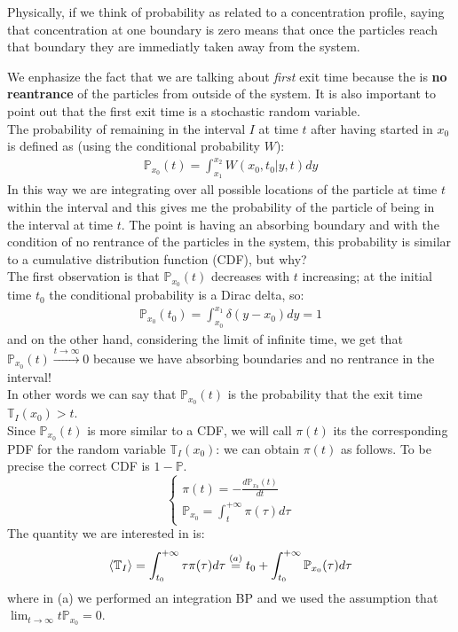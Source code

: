 \documentclass[\main/main.tex]{subfiles}
\begin{document}
Physically, if we think of probability as related to a concentration profile, saying that concentration at one boundary is zero means that once the particles reach that boundary they are immediatly taken away from the system.

We enphasize the fact that we are talking about \textit{first} exit time because the is \textbf{no reantrance} of the particles from outside of the system. It is also important to point out that the first exit time is a stochastic random variable. \\

The probability of remaining in the interval $I$ at time $t$ after having started in $x_0$ is defined as (using the conditional probability $W$):
\begin{eqnarray}
\mathbb{P}_{x_0}(t)=\int_{x_1} ^{x_2} W(x_0,t_0|y,t) dy
\label{eq:p_def}
\end{eqnarray}
In this way we are integrating over all possible locations of the particle at time $t$ within the interval and this gives me the probability of the particle of being in the interval at time $t$.
The point is having an absorbing boundary and with the condition of no rentrance of the particles in the system, this probability is similar to a cumulative distribution function (CDF), but why? \\
The first observation is that $\mathbb{P}_{x_0}(t)$ decreases with $t$ increasing; at the initial time $t_0$ the conditional probability is a Dirac delta, so:
\begin{eqnarray}
\mathbb{P}_{x_0}(t_0) = \int_{x_0} ^{x_1} \delta(y-x_0) dy = 1
\end{eqnarray}
and on the other hand, considering the limit of infinite time, we get that $\mathbb{P}_{x_0}(t)\overset{t \to\infty}{\longrightarrow}0$ because we have absorbing boundaries and no rentrance in the interval! \\
In other words we can say that $\mathbb{P}_{x_0}(t)$ is the probability that the exit time $\mathbb{T}_I(x_0)>t$. \\

Since $\mathbb{P}_{x_0}(t)$ is more similar to a CDF, we will call $\pi(t)$ its the corresponding PDF for the random variable $\mathbb{T}_I(x_0)$: we can obtain $\pi(t)$ as follows. To be precise the correct CDF is $1-\mathbb{P}$.
$$
\begin{cases}
\pi(t)=-\frac{d \mathbb{P}_{x_0}(t)}{dt} \\
\mathbb{P}_{x_0}=\int_t^{+\infty} \pi(\tau) d\tau
\end{cases}
$$
The quantity we are interested in is:
\begin{eqnarray}
\left\langle \mathbb{T}_I \right\rangle=\int_{t_0} ^{+\infty} \tau \pi(\tau)d\tau\overset{(a)}{=} t_0 + \int_{t_{0}} ^{+\infty} \mathbb{P}_{x_0}(\tau)d\tau
\end{eqnarray}
where in (a) we performed an integration BP and we used the assumption that $\lim_{t\to\infty} t\mathbb{P}_{x_{0}} = 0$. \\
\end{document}
